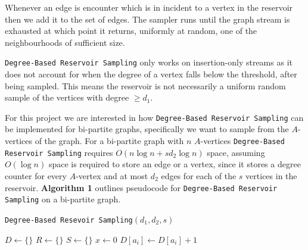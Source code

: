 \documentclass[11pt,twoside,a4paper]{report}
\begin{document}
\par Whenever an edge is encounter which is in incident to a vertex in the reservoir then we add it to the set of edges. The sampler runs until the graph stream is exhausted at which point it returns, uniformly at random, one of the neighbourhoods of sufficient size.

\par \texttt{Degree-Based Reservoir Sampling} only works on insertion-only streams as it does not account for when the degree of a vertex falls below the threshold, after being sampled. This means the reservoir is not necessarily a uniform random sample of the vertices with degree $\geq d_1$. %

\par For this project we are interested in how \texttt{Degree-Based Reservoir Sampling} can be implemented for bi-partite graphs, specifically we want to sample from the $A$-vertices of the graph. For a bi-partite graph with $n$ $A$-vertices \texttt{Degree-Based Reservoir Sampling} requires $O(n\log n+sd_2\log n)$ space, assuming $O(\log n)$ space is required to store an edge or a vertex, since it stores a degree counter for every $A$-vertex and at most $d_2$ edges for each of the $s$ vertices in the reservoir. \textbf{Algorithm 1} outlines pseudocode for \texttt{Degree-Based Reservoir Sampling} on a bi-partite graph.

\begin{algorithm}
	\caption{\texttt{Degree-Based Resevoir Sampling}$(d_1,d_2,s)$}
	$D\leftarrow\{\}$ 
	$R\leftarrow\{\}$ 
	$S\leftarrow\{\}$ 
	$x\leftarrow0$
	 {
		$D[a_i]\leftarrow D[a_i]+1$
	}
\end{algorithm}
\end{document}
